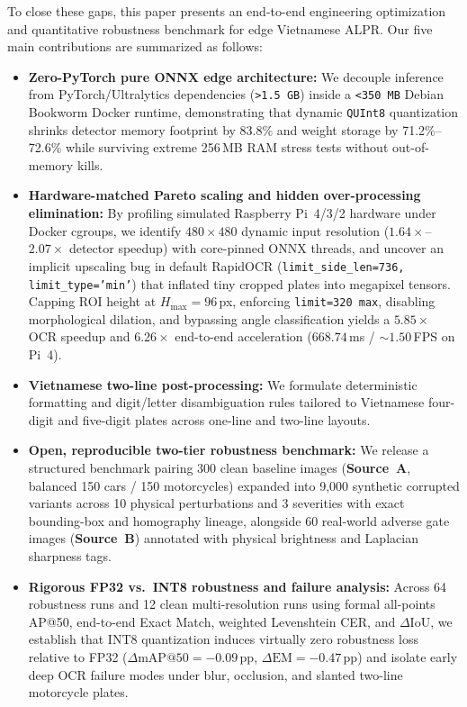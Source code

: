 \documentclass[pdflatex,sn-mathphys-num]{sn-jnl}
\begin{document}
To close these gaps, this paper presents an end-to-end engineering optimization and quantitative robustness benchmark for edge Vietnamese ALPR. Our five main contributions are summarized as follows:
\begin{itemize}
    \item \textbf{Zero-PyTorch pure ONNX edge architecture:} We decouple inference from PyTorch/Ultralytics dependencies (\texttt{>1.5\,GB}) inside a \texttt{<350\,MB} Debian Bookworm Docker runtime, demonstrating that dynamic \texttt{QUInt8} quantization shrinks detector memory footprint by 83.8\% and weight storage by 71.2\%--72.6\% while surviving extreme 256\,MB RAM stress tests without out-of-memory kills.
    \item \textbf{Hardware-matched Pareto scaling and hidden over-processing elimination:} By profiling simulated Raspberry Pi~4/3/2 hardware under Docker cgroups, we identify $480\times 480$ dynamic input resolution ($1.64\times$--$2.07\times$ detector speedup) with core-pinned ONNX threads, and uncover an implicit upscaling bug in default RapidOCR (\texttt{limit\_side\_len=736, limit\_type='min'}) that inflated tiny cropped plates into megapixel tensors. Capping ROI height at $H_{\max}=96$\,px, enforcing \texttt{limit=320 max}, disabling morphological dilation, and bypassing angle classification yields a $5.85\times$ OCR speedup and $6.26\times$ end-to-end acceleration ($668.74$\,ms / $\sim 1.50$\,FPS on Pi~4).
    \item \textbf{Vietnamese two-line post-processing:} We formulate deterministic formatting and digit/letter disambiguation rules tailored to Vietnamese four-digit and five-digit plates across one-line and two-line layouts.
    \item \textbf{Open, reproducible two-tier robustness benchmark:} We release a structured benchmark pairing 300 clean baseline images (\textbf{Source~A}, balanced 150 cars / 150 motorcycles) expanded into 9,000 synthetic corrupted variants across 10 physical perturbations and 3 severities with exact bounding-box and homography lineage, alongside 60 real-world adverse gate images (\textbf{Source~B}) annotated with physical brightness and Laplacian sharpness tags.
    \item \textbf{Rigorous FP32 vs.\ INT8 robustness and failure analysis:} Across 64 robustness runs and 12 clean multi-resolution runs using formal all-points AP@50, end-to-end Exact Match, weighted Levenshtein CER, and $\Delta\text{IoU}$, we establish that INT8 quantization induces virtually zero robustness loss relative to FP32 ($\Delta\text{mAP@50}=-0.09$\,pp, $\Delta\text{EM}=-0.47$\,pp) and isolate early deep OCR failure modes under blur, occlusion, and slanted two-line motorcycle plates.
\end{itemize}
\end{document}
